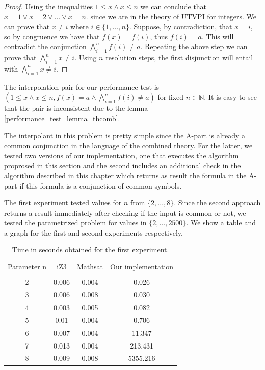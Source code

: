 \begin{proof}
  Using the inequalities $1 \leq x \land x \leq n$
  we can conclude that $x = 1 \lor x = 2 \lor \dots \lor x = n$.
  since we are in the theory of UTVPI for integers.
  We can prove that $x \neq i$ where $i \in \{1, \dots, n \}$.
  Suppose, by contradiction, that $x = i$, so by congruence
  we have that $f(x) = f(i)$, thus $f(i) = a$. This will 
  contradict the conjunction $\bigwedge_{i=1}^{n} f(i) \neq a$.
  Repeating the above step we can prove that 
  $\bigwedge_{i=1}^n x \neq i$. Using $n$ resolution steps, 
  the first disjunction will entail $\bot$ with 
  $\bigwedge_{i=1}^{n} x \neq i$.
\end{proof}

The interpolation pair for our performance test 
is $(1 \leq x \land x \leq n, 
f(x) = a \land \bigwedge_{i=1}^{n} f(i) \neq a)$
for fixed $n \in \mathbb{N}$.
It is easy to see that the pair is inconsistent due to the lemma 
\ref{performance_test_lemma_thcomb}. 

The interpolant in this problem is pretty simple since the 
A-part is already a common conjunction in the language of the
combined theory. For the latter, we tested two versions of our
implementation, one that executes the algorithm proprosed in
this section and the second includes an additional check in 
the algorithm described in this chapter which returns as result
the formula in the A-part if this formula is a conjunction of 
common symbols.

The first experiment tested values for $n$ from $\{2, \dots, 8\}$.
Since the second approach returns a result immediately after
checking if the input is common or not, we tested the parametrized
problem for values in $\{2, \dots, 2500\}$. We show a table and a
graph for the first and second experiments respectively.

\begin{table}[h]
  \centering
  \begin{tabular}{cccc}
    \toprule
    Parameter n        & iZ3 & Mathsat & Our implementation \\
    \cmidrule{2-4}                                          \\
    2 & 0.006 & 0.004 & 0.026    \\
    3 & 0.006 & 0.008 & 0.030    \\
    4 & 0.003 & 0.005 & 0.082    \\
    5 & 0.01  & 0.004 & 0.706    \\
    6 & 0.007 & 0.004 & 11.347   \\
    7 & 0.013 & 0.004 & 213.431  \\
    8 & 0.009 & 0.008 & 5355.216 \\
    \bottomrule
  \end{tabular}
  \caption{Time in seconds obtained for the first experiment.}
\end{table}

